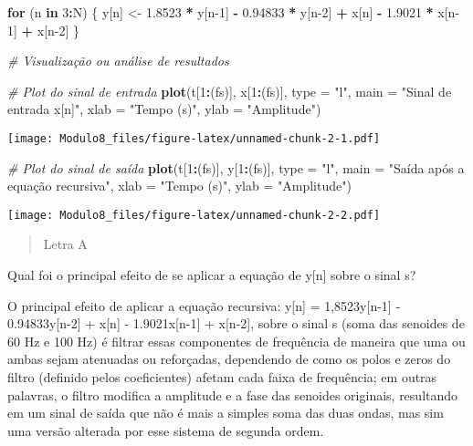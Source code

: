 \documentclass[
]{article}
\newenvironment{Shaded}{\begin{snugshade}}{\end{snugshade}}
\newcommand{\AttributeTok}[1]{\textcolor[rgb]{0.13,0.29,0.53}{#1}}
\newcommand{\CommentTok}[1]{\textcolor[rgb]{0.56,0.35,0.01}{\textit{#1}}}
\newcommand{\ControlFlowTok}[1]{\textcolor[rgb]{0.13,0.29,0.53}{\textbf{#1}}}
\newcommand{\DecValTok}[1]{\textcolor[rgb]{0.00,0.00,0.81}{#1}}
\newcommand{\FloatTok}[1]{\textcolor[rgb]{0.00,0.00,0.81}{#1}}
\newcommand{\FunctionTok}[1]{\textcolor[rgb]{0.13,0.29,0.53}{\textbf{#1}}}
\newcommand{\NormalTok}[1]{#1}
\newcommand{\OtherTok}[1]{\textcolor[rgb]{0.56,0.35,0.01}{#1}}
\newcommand{\SpecialCharTok}[1]{\textcolor[rgb]{0.81,0.36,0.00}{\textbf{#1}}}
\newcommand{\StringTok}[1]{\textcolor[rgb]{0.31,0.60,0.02}{#1}}
\begin{document}
\begin{Shaded}
\begin{Highlighting}[]
\ControlFlowTok{for}\NormalTok{ (n }\ControlFlowTok{in} \DecValTok{3}\SpecialCharTok{:}\NormalTok{N) \{}
\NormalTok{  y[n] }\OtherTok{\textless{}{-}} \FloatTok{1.8523} \SpecialCharTok{*}\NormalTok{ y[n}\DecValTok{{-}1}\NormalTok{] }\SpecialCharTok{{-}} \FloatTok{0.94833} \SpecialCharTok{*}\NormalTok{ y[n}\DecValTok{{-}2}\NormalTok{] }\SpecialCharTok{+}
\NormalTok{          x[n]     }\SpecialCharTok{{-}} \FloatTok{1.9021} \SpecialCharTok{*}\NormalTok{ x[n}\DecValTok{{-}1}\NormalTok{]   }\SpecialCharTok{+}\NormalTok{ x[n}\DecValTok{{-}2}\NormalTok{]}
\NormalTok{\}}

\CommentTok{\# Visualização ou análise de resultados}

\CommentTok{\# Plot do sinal de entrada}
\FunctionTok{plot}\NormalTok{(t[}\DecValTok{1}\SpecialCharTok{:}\NormalTok{(fs)], x[}\DecValTok{1}\SpecialCharTok{:}\NormalTok{(fs)], }\AttributeTok{type =} \StringTok{"l"}\NormalTok{, }
     \AttributeTok{main =} \StringTok{"Sinal de entrada x[n]"}\NormalTok{,}
     \AttributeTok{xlab =} \StringTok{"Tempo (s)"}\NormalTok{, }\AttributeTok{ylab =} \StringTok{"Amplitude"}\NormalTok{)}
\end{Highlighting}
\end{Shaded}

\texttt{[image: Modulo8\_files/figure-latex/unnamed-chunk-2-1.pdf]}

\begin{Shaded}
\begin{Highlighting}[]
\CommentTok{\# Plot do sinal de saída}
\FunctionTok{plot}\NormalTok{(t[}\DecValTok{1}\SpecialCharTok{:}\NormalTok{(fs)], y[}\DecValTok{1}\SpecialCharTok{:}\NormalTok{(fs)], }\AttributeTok{type =} \StringTok{"l"}\NormalTok{, }
     \AttributeTok{main =} \StringTok{"Saída após a equação recursiva"}\NormalTok{,}
     \AttributeTok{xlab =} \StringTok{"Tempo (s)"}\NormalTok{, }\AttributeTok{ylab =} \StringTok{"Amplitude"}\NormalTok{)}
\end{Highlighting}
\end{Shaded}

\texttt{[image: Modulo8\_files/figure-latex/unnamed-chunk-2-2.pdf]}

\begin{quote}
Letra A
\end{quote}

Qual foi o principal efeito de se aplicar a equação de y{[}n{]} sobre o
sinal s?

O principal efeito de aplicar a equação recursiva: y{[}n{]} =
1,8523y{[}n-1{]} - 0.94833y{[}n-2{]} + x{[}n{]} - 1.9021x{[}n-1{]} +
x{[}n-2{]}, sobre o sinal s (soma das senoides de 60 Hz e 100 Hz) é
filtrar essas componentes de frequência de maneira que uma ou ambas
sejam atenuadas ou reforçadas, dependendo de como os polos e zeros do
filtro (definido pelos coeficientes) afetam cada faixa de frequência; em
outras palavras, o filtro modifica a amplitude e a fase das senoides
originais, resultando em um sinal de saída que não é mais a simples soma
das duas ondas, mas sim uma versão alterada por esse sistema de segunda
ordem.
\end{document}

